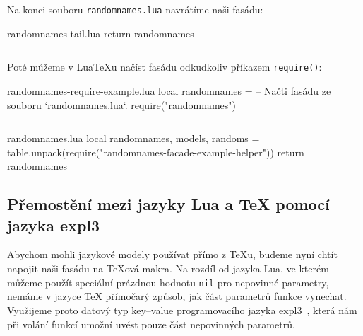 \documentclass{csbulletin}
\newcommand\myinputminted[3][]{%
  \inputminted[#1]{#2}{#3}%
}
\newcommand\myinputminted[3][]{%
  \inputminted[#1]{#2}{code-placeholder.#2}%
}
\begin{document}
Na konci souboru \texttt{randomnames.lua} navrátíme naši fasádu:

\begin{filecontents}{randomnames-tail.lua}
return randomnames
\end{filecontents}
\myinputminted{lua}{randomnames-tail.lua}

\noindent
Poté můžeme v Lua\TeX u načíst fasádu odkudkoliv příkazem \texttt{require()}:

\begin{filecontents}{randomnames-require-example.lua}
local randomnames =  -- Načti fasádu ze souboru `randomnames.lua`.
   require("randomnames")
\end{filecontents}
\myinputminted[linenos=false]{lua}{randomnames-require-example.lua}

\begin{filecontents}{randomnames.lua}
local randomnames, models, randoms = table.unpack(require("randomnames-facade-example-helper"))
return randomnames
\end{filecontents}

\subsection{Přemostění mezi jazyky Lua a \TeX{} pomocí jazyka expl3}
\label{sec:rozhrani-premosteni}

Abychom mohli jazykové modely používat přímo z \TeX u, budeme nyní chtít napojit naši fasádu na \TeX ová makra. Na rozdíl od jazyka Lua, ve kterém můžeme použít speciální prázdnou hodnotu \texttt{nil} pro nepovinné parametry, nemáme v jazyce \TeX{} přímočarý způsob, jak část parametrů funkce vynechat. Využijeme proto datový typ key--value programovacího jazyka expl3~\cite[kapitola~26]{latex2023interfaces}, která nám při volání funkcí umožní uvést pouze část nepovinných parametrů.
\end{document}
